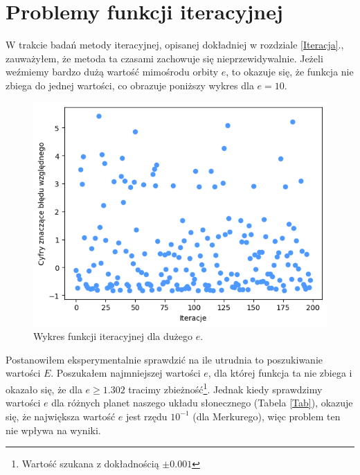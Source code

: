 \documentclass[11pt,wide]{mwart}
\begin{document}
\section{Problemy funkcji iteracyjnej} \label{Problemy}
W trakcie badań metody iteracyjnej, opisanej dokładniej w rozdziale \ref{Iteracja}., zauważyłem, że metoda ta czasami zachowuje się nieprzewidywalnie. Jeżeli weźmiemy bardzo dużą wartość mimośrodu orbity $e$, to okazuje się, że funkcja nie zbiega do jednej wartości, co obrazuje poniższy wykres dla $e = 10$.\\
\begin{figure}[H]
	\begin{center}
	\includegraphics[scale=0.6]{iteracja_rozbieznosc}
	\end{center}
	\caption{Wykres funkcji iteracyjnej dla dużego $e$.}
\end{figure}
Postanowiłem eksperymentalnie sprawdzić na ile utrudnia to poszukiwanie wartości $E$. Poszukałem najmniejszej wartości $e$, dla której funkcja ta nie zbiega i okazało się, że dla  $e \geq 1.302$ tracimy zbieżność\footnote{Wartość szukana z dokładnością $\pm 0.001$}. Jednak kiedy sprawdzimy wartości $e$ dla różnych planet naszego układu słonecznego (Tabela \ref{Tab}), okazuje się, że największa wartość $e$ jest rzędu $10^{-1}$ (dla Merkurego), więc problem ten nie wpływa na wyniki.\\
\end{document}
